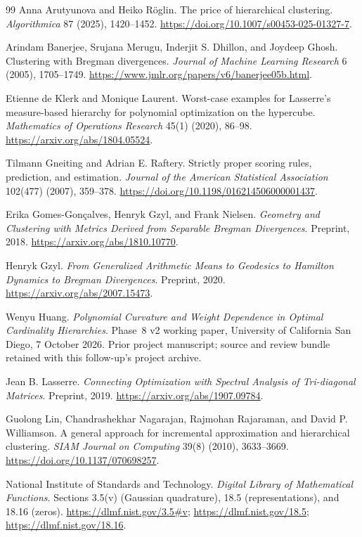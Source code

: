 \begin{thebibliography}{99}
Anna Arutyunova and Heiko R\"oglin.
The price of hierarchical clustering.
\emph{Algorithmica} 87 (2025), 1420--1452.
\url{https://doi.org/10.1007/s00453-025-01327-7}.

Arindam Banerjee, Srujana Merugu, Inderjit S. Dhillon, and Joydeep Ghosh.
Clustering with Bregman divergences.
\emph{Journal of Machine Learning Research} 6 (2005), 1705--1749.
\url{https://www.jmlr.org/papers/v6/banerjee05b.html}.

Etienne de Klerk and Monique Laurent.
Worst-case examples for Lasserre's measure-based hierarchy for polynomial
optimization on the hypercube.
\emph{Mathematics of Operations Research} 45(1) (2020), 86--98.
\url{https://arxiv.org/abs/1804.05524}.

Tilmann Gneiting and Adrian E. Raftery.
Strictly proper scoring rules, prediction, and estimation.
\emph{Journal of the American Statistical Association} 102(477) (2007),
359--378. \url{https://doi.org/10.1198/016214506000001437}.

Erika Gomes-Gon\c calves, Henryk Gzyl, and Frank Nielsen.
\emph{Geometry and Clustering with Metrics Derived from Separable Bregman
Divergences}. Preprint, 2018.
\url{https://arxiv.org/abs/1810.10770}.

Henryk Gzyl.
\emph{From Generalized Arithmetic Means to Geodesics to Hamilton Dynamics
to Bregman Divergences}. Preprint, 2020.
\url{https://arxiv.org/abs/2007.15473}.

Wenyu Huang.
\emph{Polynomial Curvature and Weight Dependence in Optimal Cardinality
Hierarchies}. Phase~8 v2 working paper, University of California San Diego,
7 October 2026. Prior project manuscript; source and review bundle retained
with this follow-up's project archive.

Jean B. Lasserre.
\emph{Connecting Optimization with Spectral Analysis of Tri-diagonal
Matrices}. Preprint, 2019.
\url{https://arxiv.org/abs/1907.09784}.

Guolong Lin, Chandrashekhar Nagarajan, Rajmohan Rajaraman, and David P. Williamson.
A general approach for incremental approximation and hierarchical clustering.
\emph{SIAM Journal on Computing} 39(8) (2010), 3633--3669.
\url{https://doi.org/10.1137/070698257}.

National Institute of Standards and Technology.
\emph{Digital Library of Mathematical Functions}.
Sections 3.5(v) (Gaussian quadrature), 18.5 (representations), and 18.16
(zeros). \url{https://dlmf.nist.gov/3.5#v};
\url{https://dlmf.nist.gov/18.5}; \url{https://dlmf.nist.gov/18.16}.


\end{thebibliography}
